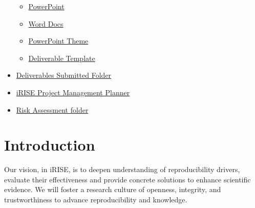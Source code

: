 \documentclass[
]{article}
\begin{document}
\begin{itemize}
  \begin{itemize}
  \item
    \href{https://charitede.sharepoint.com/:p:/r/sites/iRISE/Shared\%20Documents/General/iRISE\%20Dissemination_Communication_Templates/Templates/PPT\%20Template.pptx?d=w197f096e83fa4576a6f82bdcd51489b2\&csf=1\&web=1\&e=MREwQ4}{PowerPoint}
  \item
    \href{https://charitede.sharepoint.com/:w:/r/sites/iRISE/Shared\%20Documents/General/iRISE\%20Dissemination_Communication_Templates/Templates/DocTemplate.docx?d=wcb083ece13604791b342b0bb693fe067\&csf=1\&web=1\&e=f61QPR}{Word Docs}
  \item
    \href{https://charitede.sharepoint.com/:u:/r/sites/iRISE/Shared\%20Documents/Branding\%20and\%20Website/iRISE.thmx?csf=1\&web=1\&e=fyKrZL}{PowerPoint Theme}
  \item
    \href{https://charitede.sharepoint.com/:w:/r/sites/iRISE/Shared\%20Documents/General/iRISE\%20Dissemination_Communication_Templates/Templates/DeliverableTemplate.docx?d=w4ec2474158ab425f86655df0f923297d\&csf=1\&web=1\&e=drgFm9}{Deliverable Template}
  \end{itemize}
\item
  \href{https://charitede.sharepoint.com/:f:/r/sites/iRISE/Shared\%20Documents/General/Project\%20Outputs\%20(Deliverables,\%20Milestones,\%20Papers)/Deliverables\%20submitted?csf=1\&web=1\&e=L4NinF}{Deliverables Submitted Folder}
\item
  \href{https://tasks.office.com/charitede.onmicrosoft.com/en-US/Home/Planner/\#/plantaskboard?groupId=63cd0d10-aa1b-4db9-9bb0-ed23b58ec69b\&planId=P4fliqzuUEeyiZo6z3Z3L5YAAegq}{iRISE Project Management Planner}
\item
  \href{https://charitede.sharepoint.com/:f:/r/sites/iRISE/Shared\%20Documents/WP7/Project\%20Management/Risk\%20Assessments?csf=1\&web=1\&e=v2Nm3v}{Risk Assessment folder}
\end{itemize}

\hypertarget{introduction}{%
\section{\texorpdfstring{\textbf{Introduction}}{Introduction}}\label{introduction}}

Our vision, in iRISE, is to deepen understanding of reproducibility drivers, evaluate their effectiveness and provide concrete solutions to enhance scientific evidence. We will foster a research culture of openness, integrity, and trustworthiness to advance reproducibility and knowledge.
\end{document}
